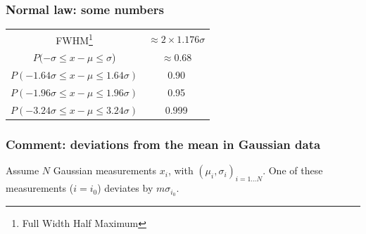 \documentclass[9pt]{beamer}
\newif\ifmynote
\newcommand\mynote[1]{%
\ifmynote \textbf{#1} \else \fi
}
\begin{document}
\begin{frame}
 \frametitle{Normal law: some numbers}
 
 \mynote{Écrire au tableau}
 
 \begin{center}
  \begin{tabular}{c|c}
   FWHM\footnote{Full Width Half Maximum} & $\approx 2 \times 1.176 \sigma$ \\
   $P(-\sigma \leq x-\mu \leq \sigma$) & $\approx 0.68$ \\
   $P(-1.64 \sigma \leq x-\mu \leq 1.64 \sigma)$ & 0.90 \\
   $P(-1.96 \sigma \leq x-\mu \leq 1.96 \sigma)$ & 0.95 \\
   $P(-3.24 \sigma \leq x-\mu \leq 3.24 \sigma)$ & 0.999 
  \end{tabular}

 \end{center}

\end{frame}

\begin{frame}
 \frametitle{Comment: deviations from the mean in Gaussian data}
 
 \mynote{Faire un dessin au tableau}
 
 Assume $N$ Gaussian measurements $x_i$, with $(\mu_i,\sigma_i)_{i=1\dots N}$. One of these measurements ($i=i_0$) deviates by $m \sigma_{i_0}$.  
 
 
\end{frame}
\end{document}
